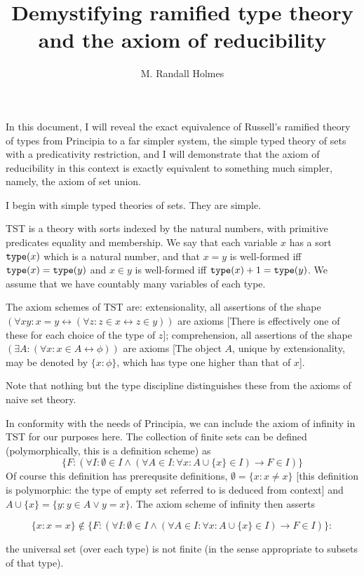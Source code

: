 \documentclass[12pt]{article}
\title{Demystifying ramified type theory and the axiom of reducibility}
\author{M. Randall Holmes}
\begin{document}
\maketitle

In this document, I will reveal the exact equivalence of Russell's ramified theory of types from Principia to a far simpler system, 
the simple typed theory of sets with a predicativity restriction, and I will demonstrate that the axiom of reducibility in this context is exactly equivalent to something much simpler, namely, the axiom of set union.

I begin with simple typed theories of sets.  They are simple.

TST is a theory with sorts indexed by the natural numbers, with primitive predicates equality and membership.  We say that each variable $x$ has a sort ${\tt type}(x)$ which is a natural number, and that $x=y$ is well-formed iff ${\tt type}(x)={\tt type}(y)$ and $x \in y$ is well-formed iff ${\tt type}(x)+1 = {\tt type}(y)$.  We assume that we have countably many variables of each type.

The axiom schemes of TST are:  extensionality, all assertions of the shape $(\forall xy:x=y \leftrightarrow (\forall z:z \in x \leftrightarrow z \in y))$ are axioms [There is effectively one of these for each choice of the type of $z$]; comprehension,
all assertions of the shape $(\exists A:(\forall x:x\in A\leftrightarrow \phi))$ are axioms [The object $A$, unique by extensionality, may be denoted by $\{x:\phi\}$, which has type one higher than that of $x$].

Note that nothing but the type discipline distinguishes these from the axioms of naive set theory.

In conformity with the needs of Principia, we can include the axiom of infinity in TST for our purposes here.  The collection of finite sets can be defined (polymorphically, this is a definition scheme) as $$\{F:(\forall I:\emptyset \in I \wedge (\forall A\in I:\forall x:A \cup \{x\} \in I) \rightarrow F \in I)\}$$  Of course this definition has prerequsite definitions, $\emptyset = \{x:x \neq x\}$ [this definition is polymorphic:  the type of empty set referred to is deduced from context] and $A \cup \{x\} = \{y:y \in A \vee y=x\}$.  The axiom scheme of infinity then asserts 

$$\{x:x=x\} \not\in \{F:(\forall I:\emptyset \in I \wedge (\forall A\in I:\forall x:A \cup \{x\} \in I) \rightarrow F \in I)\}:$$

the universal set (over each type) is not finite (in the sense appropriate to subsets of that type).
\end{document}
